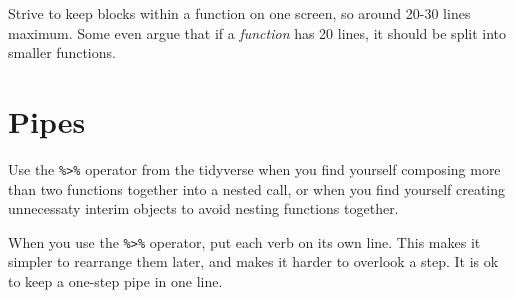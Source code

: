 \documentclass[]{book}
\newenvironment{Shaded}{\begin{snugshade}}{\end{snugshade}}
\newcommand{\KeywordTok}[1]{\textcolor[rgb]{0.13,0.29,0.53}{\textbf{{#1}}}}
\newcommand{\DataTypeTok}[1]{\textcolor[rgb]{0.13,0.29,0.53}{{#1}}}
\newcommand{\StringTok}[1]{\textcolor[rgb]{0.31,0.60,0.02}{{#1}}}
\newcommand{\CommentTok}[1]{\textcolor[rgb]{0.56,0.35,0.01}{\textit{{#1}}}}
\newcommand{\NormalTok}[1]{{#1}}
\begin{document}
Strive to keep blocks within a function on one screen, so around 20-30
lines maximum. Some even argue that if a \emph{function} has 20 lines,
it should be split into smaller functions.

\chapter{Pipes}\label{style-pipes}

Use the \texttt{\%\textgreater{}\%} operator from the tidyverse when you
find yourself composing more than two functions together into a nested
call, or when you find yourself creating unnecessaty interim objects to
avoid nesting functions together.

\begin{Shaded}
\end{Shaded}

When you use the \texttt{\%\textgreater{}\%} operator, put each verb on
its own line. This makes it simpler to rearrange them later, and makes
it harder to overlook a step. It is ok to keep a one-step pipe in one
line.

\begin{Shaded}
\end{Shaded}
\end{document}
